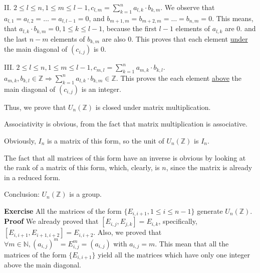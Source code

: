 \documentclass[12pt]{article}
\begin{document}
II. \( 2 \leq l \leq n,1 \leq m \leq l-1, c_{l,m}=\sum_{k=1}^{n} a_{l,k} \cdot b_{k,m} \). \newline
We observe that \( a_{l,1}=a_{l,2}= \dots =a_{l,l-1}=0 \), and \( b_{m+1,m}=b_{m+2,m}= \dots =b_{n,m}=0 \). \newline
This means, that \( a_{l,k} \cdot b_{k,m}=0, 1 \leq k \leq l-1 \), \newline
because the first \( l-1 \) elements of \( a_{l,k} \) are \( 0 \). \newline
and the last  \( n-m \) elements of \( b_{k,m} \) are also \( 0 \). \newline
This proves that each element \underline{under} the main diagonal of \( (c_{i,j}) \) is \( 0 \). \newline

III. \( 2 \leq l \leq n,1 \leq m \leq l-1, c_{m,l}=\sum_{k=1}^{n} a_{m,k} \cdot b_{k,l} \). \newline
\( a_{m,k},b_{k,l} \in \mathbb{Z} \Rightarrow \sum_{k=1}^{n} a_{l,k} \cdot b_{k,m} \in \mathbb{Z} \). \newline
This proves the each element \underline{above} the main diagonal of \( (c_{i,j}) \) is an integer. \newline

Thus, we prove that \( U_{n}(\mathbb{Z}) \) is closed under matrix multiplication. \newline

Associativity is obvious, from the fact that matrix multiplication is associative. \newline

Obviously, \( I_{n} \) is a matrix of this form, so the unit of \( U_{n}(\mathbb{Z}) \) is \( I_{n} \). \newline

The fact that all matrices of this form have an inverse is obvious by looking at the rank of
a matrix of this form, which, clearly, is \( n \), since the matrix is already in a reduced form. \newline

Conclusion: \( U_{n}(\mathbb{Z}) \) is a group. \newline

\textbf{Exercise} All the matrices of the form \( \{ E_{i,i+1}, 1 \leq i \leq n-1 \} \) generate \( U_{n}(\mathbb{Z}) \). \newline \newline
\textbf{Proof} \newline
We already proved that \( [E_{i,j},E_{j,k}]=E_{i,k} \), specifically, \( [E_{i,i+1},E_{i+1,i+2}]=E_{i,i+2} \). \newline
Also, we proved that \( \forall m \in \mathbb{N}, (a_{i,j})^m=E_{i,j}^m=(a_{i,j}) \) with \( a_{i,j}=m \). \newline
This mean that all the matrices of the form \( \{ E_{i,i+1} \} \) yield all the matrices which have only one integer above 
the main diagonal. \newline
\end{document}
